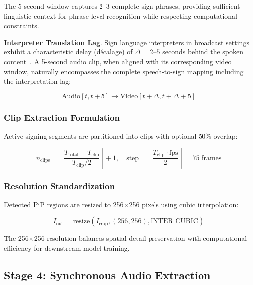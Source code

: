 \documentclass[journal]{IEEEtran}
\begin{document}
The 5-second window captures 2--3 complete sign phrases, providing sufficient linguistic context for phrase-level recognition while respecting computational constraints.

\textbf{Interpreter Translation Lag.} Sign language interpreters in broadcast settings exhibit a characteristic delay (décalage) of $\Delta = 2$--$5$ seconds behind the spoken content~\cite{camgoz2018neural}. A 5-second audio clip, when aligned with its corresponding video window, naturally encompasses the complete speech-to-sign mapping including the interpretation lag:

\begin{equation}
\text{Audio}[t, t+5] \rightarrow \text{Video}[t + \Delta, t + \Delta + 5]
\end{equation}

\subsubsection{Clip Extraction Formulation}

Active signing segments are partitioned into clips with optional 50\% overlap:

\begin{equation}
n_{\text{clips}} = \left\lfloor \frac{T_{\text{total}} - T_{\text{clip}}}{T_{\text{clip}} / 2} \right\rfloor + 1, \quad \text{step} = \left\lceil \frac{T_{\text{clip}} \cdot \text{fps}}{2} \right\rceil = 75 \text{ frames}
\end{equation}

\subsubsection{Resolution Standardization}

Detected PiP regions are resized to 256$\times$256 pixels using cubic interpolation:

\begin{equation}
I_{\text{out}} = \text{resize}(I_{\text{crop}}, (256, 256), \text{INTER\_CUBIC})
\end{equation}

The 256$\times$256 resolution balances spatial detail preservation with computational efficiency for downstream model training.

\subsection{Stage 4: Synchronous Audio Extraction}
\end{document}
